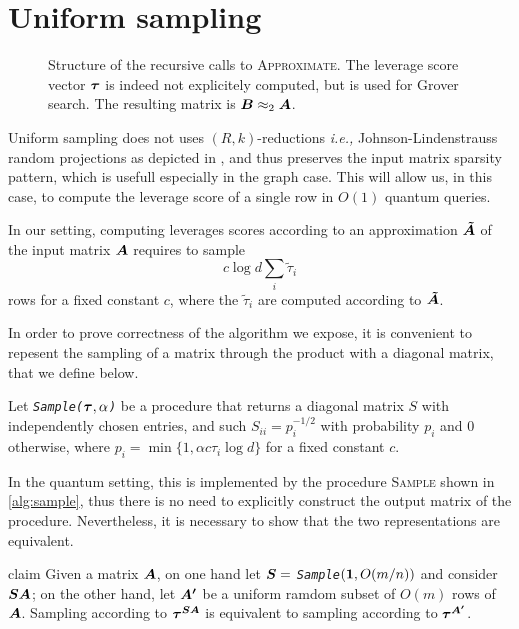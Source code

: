 \section{Uniform sampling}
\label{sec:uniform_sampling}

\begin{figure*}
    \centering
    
    \caption{Structure of the recursive calls to \textsc{Approximate}. The
    leverage score vector $\boldsymbol \tau$ is indeed not explicitely computed, but is
    used for Grover search. The resulting matrix is $\boldsymbol B \approx_2 \boldsymbol A$.}
    \label{fig:sampling}
\end{figure*}

Uniform sampling does not uses $(R,k)$-reductions \textit{i.e.,}
Johnson-Lindenstrauss random projections as depicted in
\cite{li_iterative_2013}, and thus preserves the input matrix sparsity pattern,
which is usefull especially in the graph case. This will allow us, in this case,
to compute the leverage score of a single row in $O(1)$ quantum queries.

In our setting, computing leverages scores according to an approximation
$\boldsymbol{\tilde A}$ of the input matrix $\boldsymbol A$ requires to sample $$c \log d \sum_i
\tilde \tau_i$$ rows for a fixed constant $c$, where the $\tilde \tau_i$ are
computed according to $\boldsymbol{\tilde A}$.

In order to prove correctness of the algorithm we expose, it is convenient to
repesent the sampling of a matrix through the product with a diagonal matrix,
that we define below.

\begin{definition}
    Let  \emph{\texttt{Sample($\boldsymbol \tau, \alpha$)}} be a procedure that returns a
    diagonal matrix $S$ with independently chosen entries, and such $S_{ii} =
    p_i^{-1/2}$ with probability $p_i$ and $0$ otherwise, where $p_i = \min\{1,
    \alpha c \tau_i \log d\}$ for a fixed constant $c$.
\end{definition}

In the quantum setting, this is implemented by the procedure \textsc{Sample}
shown in \autoref{alg:sample}, thus there is no need to explicitly construct the
output matrix of the procedure. Nevertheless, it is necessary to show that the
two representations are equivalent.

\begin{theoremEnd}{claim}
    Given a matrix $\boldsymbol A$, on one hand let $\boldsymbol{S} = $ \emph{\texttt{Sample}}$(\boldsymbol 1,
    O(m/n))$ and consider $\boldsymbol{SA}$; on the other hand, let $\boldsymbol{A'}$ be a
    uniform ramdom subset of $O(m)$ rows of $\boldsymbol A$. Sampling according to
    $\boldsymbol{\tau^{SA}}$ is equivalent to sampling according to $\boldsymbol{\tau^{A'}}$.
\end{theoremEnd}

